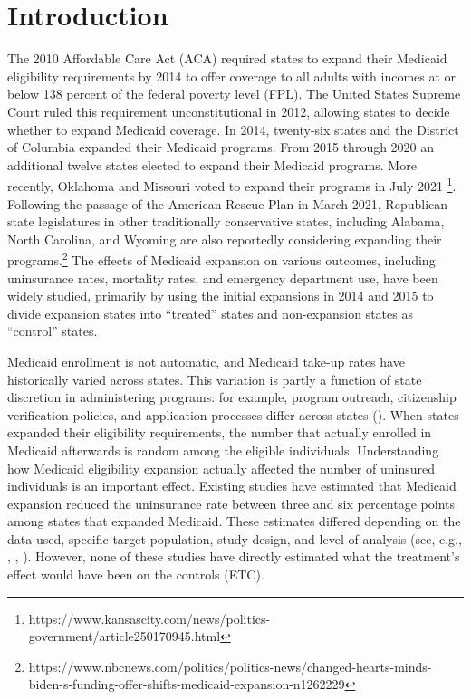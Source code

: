 \documentclass[aoas]{imsart}
\theoremstyle{plain}
\theoremstyle{remark}
\begin{document}
\section{Introduction}

The 2010 Affordable Care Act (ACA) required states to expand their Medicaid eligibility requirements by 2014 to offer coverage to all adults with incomes at or below 138 percent of the federal poverty level (FPL). The United States Supreme Court ruled this requirement unconstitutional in 2012, allowing states to decide whether to expand Medicaid coverage. In 2014, twenty-six states and the District of Columbia expanded their Medicaid programs. From 2015 through 2020 an additional twelve states elected to expand their Medicaid programs. More recently, Oklahoma and Missouri voted to expand their programs in July 2021 \footnote{https://www.kansascity.com/news/politics-government/article250170945.html}. Following the passage of the American Rescue Plan in March 2021, Republican state legislatures in other traditionally conservative states, including Alabama, North Carolina, and Wyoming are also reportedly considering expanding their programs.\footnote{https://www.nbcnews.com/politics/politics-news/changed-hearts-minds-biden-s-funding-offer-shifts-medicaid-expansion-n1262229} The effects of Medicaid expansion on various outcomes, including uninsurance rates, mortality rates, and emergency department use, have been widely studied, primarily by using the initial expansions in 2014 and 2015 to divide expansion states into ``treated'' states and non-expansion states as ``control'' states. 

Medicaid enrollment is not automatic, and Medicaid take-up rates have historically varied across states. This variation is partly a function of state discretion in administering programs: for example, program outreach, citizenship verification policies, and application processes differ across states (\cite{courtemanche2017early}). When states expanded their eligibility requirements, the number that actually enrolled in Medicaid afterwards is random among the eligible individuals. Understanding how Medicaid eligibility expansion actually affected the number of uninsured individuals is an important effect. Existing studies have estimated that Medicaid expansion reduced the uninsurance rate between three and six percentage points among states that expanded Medicaid. These estimates differed depending on the data used, specific target population, study design, and level of analysis (see, e.g., \cite{kaestner2017effects}, \cite{courtemanche2017early}, \cite{frean2017premium}). However, none of these studies have directly estimated what the treatment's effect would have been on the controls (ETC). 
\end{document}
